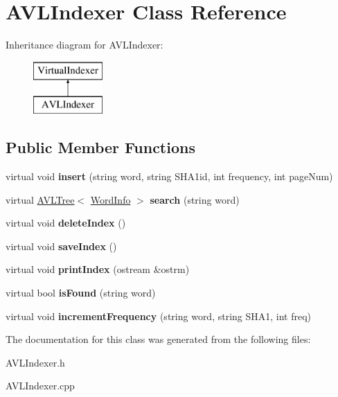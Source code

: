 \hypertarget{class_a_v_l_indexer}{\section{A\+V\+L\+Indexer Class Reference}
\label{class_a_v_l_indexer}
}
Inheritance diagram for A\+V\+L\+Indexer\+:\begin{figure}[H]
\begin{center}
\leavevmode
\includegraphics[height=2.000000cm]{class_a_v_l_indexer}
\end{center}
\end{figure}
\subsection*{Public Member Functions}
\begin{DoxyCompactItemize}
\item 
\hypertarget{class_a_v_l_indexer_a23e1a552dec97821bc8090795513b513}{virtual void {\bfseries insert} (string word, string S\+H\+A1id, int frequency, int page\+Num)}\label{class_a_v_l_indexer_a23e1a552dec97821bc8090795513b513}

\item 
\hypertarget{class_a_v_l_indexer_a1c5073ebd52743d66ae2ae4a7376945a}{virtual \hyperlink{class_a_v_l_tree}{A\+V\+L\+Tree}$<$ \hyperlink{class_word_info}{Word\+Info} $>$ {\bfseries search} (string word)}\label{class_a_v_l_indexer_a1c5073ebd52743d66ae2ae4a7376945a}

\item 
\hypertarget{class_a_v_l_indexer_a86efca0a4e959fa4ea41e7b444edc1b1}{virtual void {\bfseries delete\+Index} ()}\label{class_a_v_l_indexer_a86efca0a4e959fa4ea41e7b444edc1b1}

\item 
\hypertarget{class_a_v_l_indexer_a7bfb4ec1c8b17045ce5d950747d318e0}{virtual void {\bfseries save\+Index} ()}\label{class_a_v_l_indexer_a7bfb4ec1c8b17045ce5d950747d318e0}

\item 
\hypertarget{class_a_v_l_indexer_aa578ab6696c640480beee1f905cfea60}{virtual void {\bfseries print\+Index} (ostream \&ostrm)}\label{class_a_v_l_indexer_aa578ab6696c640480beee1f905cfea60}

\item 
\hypertarget{class_a_v_l_indexer_adc22599101f713d2d72d09a8cfdb8253}{virtual bool {\bfseries is\+Found} (string word)}\label{class_a_v_l_indexer_adc22599101f713d2d72d09a8cfdb8253}

\item 
\hypertarget{class_a_v_l_indexer_abe949f9056e016f07094dce1846b90e4}{virtual void {\bfseries increment\+Frequency} (string word, string S\+H\+A1, int freq)}\label{class_a_v_l_indexer_abe949f9056e016f07094dce1846b90e4}

\end{DoxyCompactItemize}


The documentation for this class was generated from the following files\+:\begin{DoxyCompactItemize}
\item 
A\+V\+L\+Indexer.\+h\item 
A\+V\+L\+Indexer.\+cpp\end{DoxyCompactItemize}
